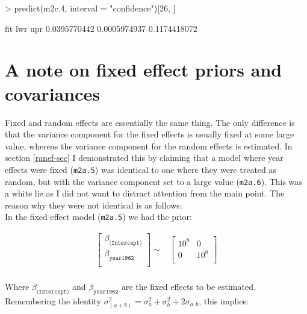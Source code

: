 \documentclass{article}
\begin{document}
\begin{Schunk}
\begin{Sinput}
> predict(m2c.4, interval = "confidence")[26, ]
\end{Sinput}
\begin{Soutput}
         fit          lwr          upr 
0.0395770442 0.0005974937 0.1174418072 
\end{Soutput}
\end{Schunk}


\section{A note on fixed effect priors and covariances}
\label{PriorContr-sec}

Fixed and random effects are essentially the same thing. The only difference is that the variance component for the fixed effects is usually fixed at some large value, whereas the variance component for the random effects is estimated.  In section \ref{ranef-sec} I demonstrated this by claiming that a model where year effects were fixed (\texttt{m2a.5}) was identical to one where they were treated as random, but with the variance component set to a large value (\texttt{m2a.6}). This was a white lie as I did not want to distract attention from the main point. The reason why they were not identical is as follows:\\

In the fixed effect model (\texttt{m2a.5}) we had the prior:  

\begin{equation}
\begin{array}{rcl}
\left[
\begin{array}{c}
 \beta_{\texttt{(Intercept)}}\\
 \beta_{\texttt{year1962}}\\
\end{array}
\right]
\sim
&
\left[
\begin{array}{cc}
10^8&0\\
0&10^8\\
\end{array}
\right]\\
\end{array}
\end{equation}

Where $\beta_{\texttt{(Intercept)}}$ and $\beta_{\texttt{year1962}}$ are the fixed effects to be estimated.\\

Remembering the identity  $\sigma^{2}_{(a+b)} = \sigma^{2}_{a}+ \sigma^{2}_{b}+2\sigma_{a,b}$, this implies:
\end{document}
